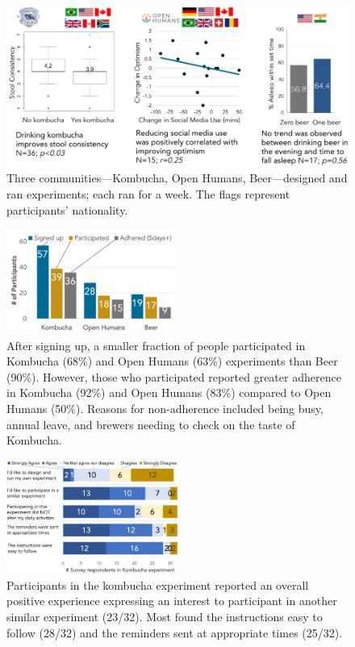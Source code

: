 \begin{figure}[h] 
\centering
  \includegraphics[width=1.0\textwidth]{figures/galileo/galileo-study3}
  \caption[]
{Three communities—Kombucha, Open Humans, Beer—designed and ran experiments; each ran for a week. The flags represent participants’ nationality. }
  \label{fig:galileo-result3}
\end{figure}

\begin{figure}[h] 
\centering
  \includegraphics[width=0.5\textwidth]{figures/galileo/galileo-study3-1}
  \caption[]
{After signing up, a smaller fraction of people participated in Kombucha (68\%) and Open Humans (63\%) experiments than Beer (90\%). However, those who participated reported greater adherence in Kombucha (92\%) and Open Humans (83\%) compared to Open Humans (50\%). Reasons for non-adherence included being busy, annual leave, and brewers needing to check on the taste of Kombucha. }
  \label{fig:galileo-result3-1}
\end{figure}

\begin{figure}[h] 
\centering
  \includegraphics[width=0.5\textwidth]{figures/galileo/galileo-study3-2}
  \caption[]
{Participants in the kombucha experiment reported an overall positive experience expressing an interest to participant in another similar experiment (23/32). Most found the instructions easy to follow (28/32) and the reminders sent at appropriate times (25/32). }
  \label{fig:galileo-result3-2}
\end{figure}


